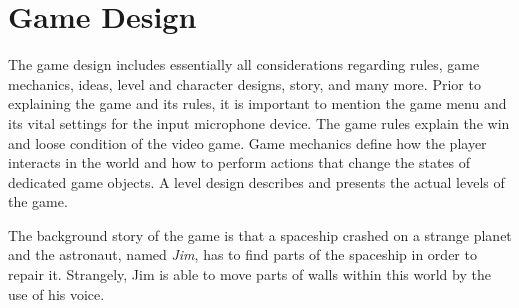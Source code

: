 
\section{Game Design}\label{sec:game_design}
The game design includes essentially all considerations regarding rules, game mechanics, ideas, level and character designs, story, and many more. 
Prior to explaining the game and its rules, it is important to mention the game menu and its vital settings for the input microphone device.
The game rules explain the win and loose condition of the video game.
Game mechanics define how the player interacts in the world and how to perform actions that change the states of dedicated game objects.
A level design describes and presents the actual levels of the game.

The background story of the game is that a spaceship crashed on a strange planet and the astronaut, named \emph{Jim}, has to find parts of the spaceship in order to repair it.
Strangely, Jim is able to move parts of walls within this world by the use of his voice.



